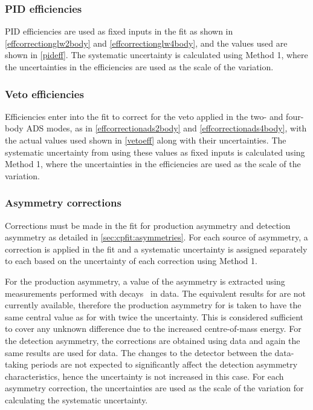 \subsubsection{PID efficiencies}

PID efficiencies are used as fixed inputs in the \CP fit as shown in \eqns\ref{effcorrectionglw2body} and \ref{effcorrectionglw4body}, and the values used are shown in \tab\ref{pideff}. The systematic uncertainty is calculated using Method 1, where the uncertainties in the efficiencies are used as the scale of the variation.

\subsubsection{Veto efficiencies}

Efficiencies enter into the \CP fit to correct for the veto applied in the two- and four-body ADS modes, as in \eqns\ref{effcorrectionads2body} and \ref{effcorrectionads4body}, with the actual values used shown in \tab\ref{vetoeff} along with their uncertainties. The systematic uncertainty from using these values as fixed inputs is calculated using Method 1, where the uncertainties in the efficiencies are used as the scale of the variation.

\subsubsection{Asymmetry corrections}

Corrections must be made in the \CP fit for production asymmetry and detection asymmetry as detailed in \sect\ref{sec:cpfit:asymmetries}. For each source of asymmetry, a correction is applied in the \CP fit and a systematic uncertainty is assigned separately to each based on the uncertainty of each correction using Method 1. 

For the production asymmetry, a \runone value of the asymmetry is extracted using measurements performed with \decay{\Bp}{\Dzb\pip} decays~\cite{LHCb-PAPER-2016-054} in data. The equivalent results for \runtwo are not currently available, therefore the production asymmetry for \runtwo is taken to have the same central value as for \runone with twice the uncertainty. This is considered sufficient to cover any unknown difference due to the increased centre-of-mass energy. For the detection asymmetry, the corrections are obtained using \runone data and again the same results are used for \runtwo data. The changes to the detector between the data-taking periods are not expected to significantly affect the detection asymmetry characteristics, hence the uncertainty is not increased in this case.  For each asymmetry correction, the uncertainties are used as the scale of the variation for calculating the systematic uncertainty.

